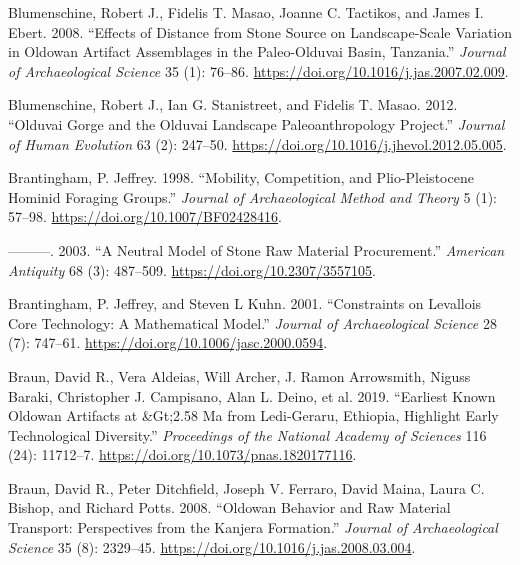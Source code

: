 \documentclass[]{elsarticle} %
\begin{document}
\leavevmode\hypertarget{ref-blumenschineEffectsDistanceStone2008}{}%
Blumenschine, Robert J., Fidelis T. Masao, Joanne C. Tactikos, and James
I. Ebert. 2008. ``Effects of Distance from Stone Source on
Landscape-Scale Variation in Oldowan Artifact Assemblages in the
Paleo-Olduvai Basin, Tanzania.'' \emph{Journal of Archaeological
Science} 35 (1): 76--86.
\url{https://doi.org/10.1016/j.jas.2007.02.009}.

\leavevmode\hypertarget{ref-blumenschineOlduvaiGorgeOlduvai2012}{}%
Blumenschine, Robert J., Ian G. Stanistreet, and Fidelis T. Masao. 2012.
``Olduvai Gorge and the Olduvai Landscape Paleoanthropology Project.''
\emph{Journal of Human Evolution} 63 (2): 247--50.
\url{https://doi.org/10.1016/j.jhevol.2012.05.005}.

\leavevmode\hypertarget{ref-brantinghamMobilityCompetitionPlioPleistocene1998}{}%
Brantingham, P. Jeffrey. 1998. ``Mobility, Competition, and
Plio-Pleistocene Hominid Foraging Groups.'' \emph{Journal of
Archaeological Method and Theory} 5 (1): 57--98.
\url{https://doi.org/10.1007/BF02428416}.

\leavevmode\hypertarget{ref-brantinghamNeutralModelStone2003}{}%
---------. 2003. ``A Neutral Model of Stone Raw Material Procurement.''
\emph{American Antiquity} 68 (3): 487--509.
\url{https://doi.org/10.2307/3557105}.

\leavevmode\hypertarget{ref-brantinghamConstraintsLevalloisCore2001}{}%
Brantingham, P. Jeffrey, and Steven L Kuhn. 2001. ``Constraints on
Levallois Core Technology: A Mathematical Model.'' \emph{Journal of
Archaeological Science} 28 (7): 747--61.
\url{https://doi.org/10.1006/jasc.2000.0594}.

\leavevmode\hypertarget{ref-braunEarliestKnownOldowan2019}{}%
Braun, David R., Vera Aldeias, Will Archer, J. Ramon Arrowsmith, Niguss
Baraki, Christopher J. Campisano, Alan L. Deino, et al. 2019. ``Earliest
Known Oldowan Artifacts at \&Gt;2.58 Ma from Ledi-Geraru, Ethiopia,
Highlight Early Technological Diversity.'' \emph{Proceedings of the
National Academy of Sciences} 116 (24): 11712--7.
\url{https://doi.org/10.1073/pnas.1820177116}.

\leavevmode\hypertarget{ref-braunOldowanBehaviorRaw2008}{}%
Braun, David R., Peter Ditchfield, Joseph V. Ferraro, David Maina, Laura
C. Bishop, and Richard Potts. 2008. ``Oldowan Behavior and Raw Material
Transport: Perspectives from the Kanjera Formation.'' \emph{Journal of
Archaeological Science} 35 (8): 2329--45.
\url{https://doi.org/10.1016/j.jas.2008.03.004}.
\end{document}

